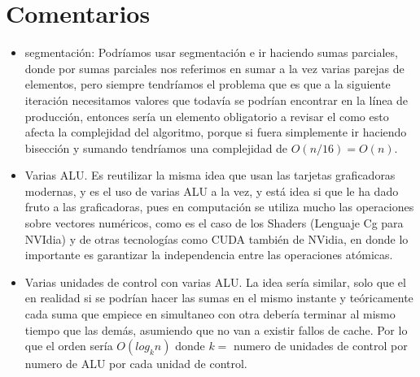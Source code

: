 \documentclass[%
	final,
	notitlepage,
	narroweqnarray,
	inline,
	twoside,
	]{ieee}
\begin{document}
\section{Comentarios}
\begin{itemize}
\PARstart para esta entrega dos, hemos estado contemplando las diferentes
posibilidades para intentar hacer el código de instrucción, sumar
vector, en un orden inferior $O(n)$, aunque por obvias razones tenemos
que visitar cada elemento del vector al menos una vez tenemos que
empezar a analizar que pasa cuando visitamos varios de ellos en
simultaneo.

\item segmentación:
Podríamos usar segmentación e ir haciendo sumas parciales, donde por
sumas parciales nos referimos en sumar a la vez varias parejas de
elementos, pero siempre tendríamos  el problema que es que a la
siguiente iteración necesitamos valores que todavía se podrían
encontrar en la línea de producción, entonces sería un elemento
obligatorio a revisar el como esto afecta la complejidad del
algoritmo, porque si fuera simplemente ir haciendo bisección y sumando
tendríamos una complejidad de $O(n/16) = O(n)$.

\item Varias ALU.
Es reutilizar la misma idea que usan las tarjetas graficadoras
modernas, y es el uso de varias ALU a la vez, y está idea si que le ha
dado fruto a las graficadoras, pues en computación se utiliza mucho
las operaciones sobre vectores numéricos, como es el caso de los
Shaders (Lenguaje Cg para NVIdia) y de otras tecnologías como CUDA
también de NVidia, en donde lo importante es garantizar la
independencia entre las operaciones atómicas.

\item Varias unidades de control con varias ALU.
La idea sería similar, solo que el en realidad si se podrían hacer las
sumas en el mismo instante y teóricamente cada suma que empiece en
simultaneo con otra debería terminar al mismo tiempo que las demás,
asumiendo que no van a existir fallos de cache. Por lo que el orden
sería $O(log_k n)$ donde $k =$ numero de unidades de control por numero de
ALU por cada unidad de control.
\end{itemize}
\end{document}
